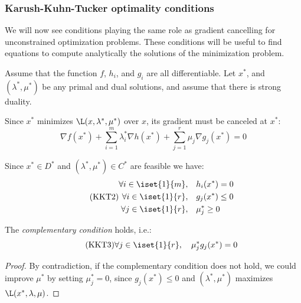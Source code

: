 \documentclass{../cs-classes/cs-classes}
\begin{document}
\subsubsection{Karush-Kuhn-Tucker optimality conditions}
We will now see conditions playing the same role as gradient cancelling for unconstrained optimization problems. These conditions will be useful to find equations to compute analytically the solutions of the minimization problem.

Assume that the function $f$, $h_i$, and $g_i$ are all differentiable. Let $x^*$, and $(\lambda^*, \mu^*)$ be any primal and dual solutions, and assume that there is strong duality.

\begin{property}[KKT1]
    Since $x^*$ minimizes $\L(x, \lambda^*, \mu^*)$ over $x$, its gradient must be canceled at $x^*$:
    \begin{equation}
        \tag{KKT1}
        \nabla f(x^*) + \sum_{i=1}^m \lambda_i^*\nabla h(x^*) + \sum_{j=1}^r\mu_j\nabla g_j(x^*)=0
    \end{equation}
\end{property}

\begin{property}[KKT2]
    Since $x^*\in D^*$ and $(\lambda^*, \mu^*)\in C^*$ are feasible we have:
    \begin{equation}
        \tag{KKT2}
        \begin{aligned}
            \forall i\in\iset{1}{m},& \quad h_i(x^*)=0\\
            \forall i\in\iset{1}{r},& \quad g_j(x^*)\leq0\\
            \forall j\in\iset{1}{r},& \quad \mu_j^*\geq0
        \end{aligned}
    \end{equation}
\end{property}

\begin{property}[KKT3]
    The \emph{complementary condition} holds, i.e.:
    \begin{equation}
        \tag{KKT3}
        \forall j\in\iset{1}{r}, \quad \mu^*_jg_j(x^*)=0
    \end{equation}
\end{property}
\begin{proof}
    By contradiction, if the complementary condition does not hold, we could improve $\mu^*$ by setting $\mu_j^*=0$, since $g_j(x^*)\leq0$ and $(\lambda^*, \mu^*)$ maximizes $\L(x^*, \lambda, \mu)$.
\end{proof}
\end{document}
